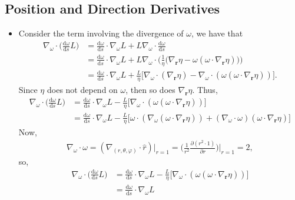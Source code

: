 \documentclass[10pt]{article}
\newcommand{\dee}{\mathrm{d}}
\newcommand{\ve}[1]{\mathbf{#1}}
\begin{document}
  \subsection{Position and Direction Derivatives}
  \begin{itemize}
    \item Consider the term involving the divergence of $\omega$, we have that
    \begin{align*}
      \nabla_{\omega} \cdot \bigg( \frac{\dee \omega}{\dee s} L \bigg)
      &= \frac{\dee \omega}{\dee s} \cdot \nabla_{\omega} L + L \nabla_{\omega} \cdot \frac{\dee \omega}{\dee s}\\
      &= \frac{\dee \omega}{\dee s} \cdot \nabla_{\omega} L + L \nabla_{\omega} \cdot \bigg( \frac{1}{\eta} \big(\nabla_{\ve{r}}\eta - \omega (\omega \cdot \nabla_{\ve{r}}\eta)\big) \bigg)\\
      &= \frac{\dee \omega}{\dee s} \cdot \nabla_{\omega} L 
      + \frac{L}{\eta} \big[ \nabla_{\omega} \cdot (\nabla_{\ve{r}}\eta) - \nabla_{\omega} \cdot (\omega (\omega \cdot \nabla_{\ve{r}}\eta))\big].
    \end{align*}
    Since $\eta$ does not depend on $\omega$, then so does $\nabla_{\ve{r}} \eta$. Thus,
    \begin{align*}
      \nabla_{\omega} \cdot \bigg( \frac{\dee \omega}{\dee s} L \bigg)
      &= \frac{\dee \omega}{\dee s} \cdot \nabla_{\omega} L 
      - \frac{L}{\eta} \big[ \nabla_{\omega} \cdot (\omega (\omega \cdot \nabla_{\ve{r}}\eta))\big]\\
      &= \frac{\dee \omega}{\dee s} \cdot \nabla_{\omega} L 
      - \frac{L}{\eta} \big[ \omega \cdot (\nabla_\omega(\omega \cdot \nabla_{\ve{r}} \eta)) 
      + (\nabla_\omega \cdot \omega) (\omega \cdot \nabla_{\ve{r}} \eta) \big]
    \end{align*}
    Now,
    \begin{align*}
      \nabla_\omega \cdot \omega 
      = (\nabla_{(r,\theta,\varphi)} \cdot \hat r )\Big|_{r=1}
      = \bigg( \frac{1}{r^2} \frac{\partial (r^2 \cdot 1) }{\partial r} \bigg) \bigg|_{r=1}
      = 2,
    \end{align*}
    so,
    \begin{align*}
      \nabla_{\omega} \cdot \bigg( \frac{\dee \omega}{\dee s} L \bigg)
      &= \frac{\dee \omega}{\dee s} \cdot \nabla_{\omega} L 
      - \frac{L}{\eta} \big[ \nabla_{\omega} \cdot (\omega (\omega \cdot \nabla_{\ve{r}}\eta))\big]\\
      &= \frac{\dee \omega}{\dee s} \cdot \nabla_{\omega} L 

\end{align*}
\end{itemize}
\end{document}
